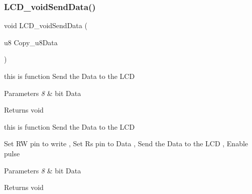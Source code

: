 \subsubsection{LCD\_voidSendData()}
{\footnotesize\ttfamily void L\+C\+D\+\_\+void\+Send\+Data (\begin{DoxyParamCaption}\item[{u8}]{Copy\+\_\+u8\+Data }\end{DoxyParamCaption})}



this is function Send the Data to the L\+CD 


\begin{DoxyParams}{Parameters}
{\em 8} & bit Data\\
\hline
\end{DoxyParams}
\begin{DoxyReturn}{Returns}
void
\end{DoxyReturn}
this is function Send the Data to the L\+CD

Set RW pin to write , Set Rs pin to Data , Send the Data to the L\+CD , Enable pulse


\begin{DoxyParams}{Parameters}
{\em 8} & bit Data\\
\hline
\end{DoxyParams}
\begin{DoxyReturn}{Returns}
void 
\end{DoxyReturn}
